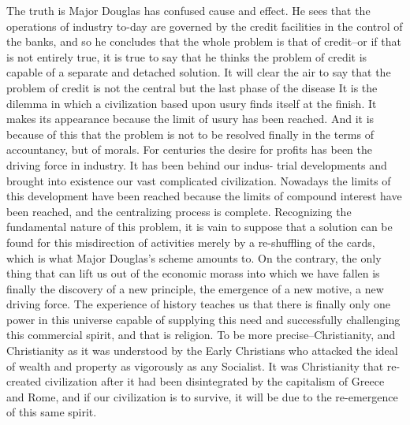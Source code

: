 \documentclass{book}
\begin{document}
The truth is Major Douglas has confused cause and effect. He sees that the operations of industry to-day are governed by the credit facilities in the control of the banks, and so he concludes that the whole problem is that of credit–or if that is not entirely true, it is true to say that he thinks the problem of credit is capable of a separate and detached solution. It will clear the air to say that the problem of credit is not the central but the last phase of the disease It is the dilemma in which a civilization based upon usury finds itself at the finish. It makes its appearance because the limit of usury has been reached. And it is because of this that the problem is not to be resolved finally in the terms of accountancy, but of morals. For centuries the desire for profits has been the driving force in industry. It has been behind our indus- trial developments and brought into existence our vast complicated civilization. Nowadays the limits of this development have been reached because the limits of compound interest have been reached, and the centralizing process is complete. Recognizing the fundamental nature of this problem, it is vain to suppose that a solution can be found for this misdirection of activities merely by a re-shuffling of the cards, which is what Major Douglas’s scheme amounts to. On the contrary, the only thing that can lift us out of the economic morass into which we have fallen is finally the discovery of a new principle, the emergence of a new motive, a new driving force. The experience of history teaches us that there is finally only one power in this universe capable of supplying this need and successfully challenging this commercial spirit, and that is religion. To be more precise–Christianity, and Christianity as it was understood by the Early Christians who attacked the ideal of wealth and property as vigorously as any Socialist. It was Christianity that re-created civilization after it had been disintegrated by the capitalism of Greece and Rome, and if our civilization is to survive, it will be due to the re-emergence of this same spirit.
\end{document}
